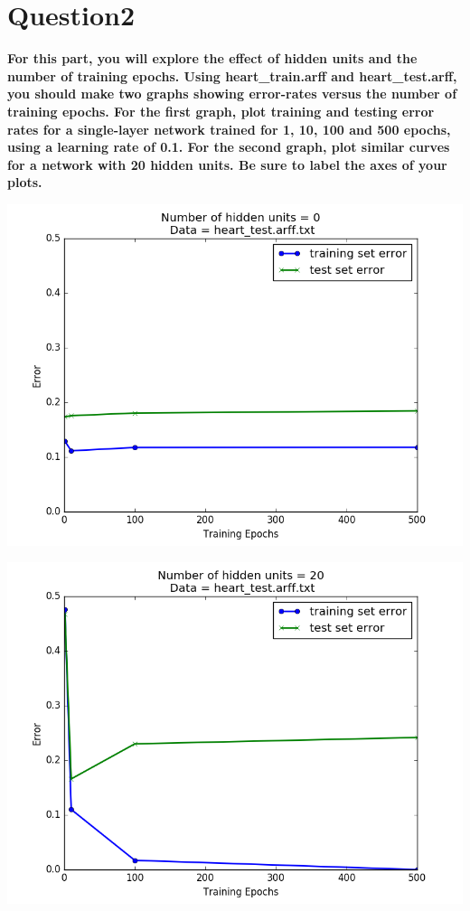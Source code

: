 \documentclass[paper=a4, fontsize=11pt]{scrartcl} %
\numberwithin{equation}{section} %
\numberwithin{figure}{section} %
\numberwithin{table}{section} %
\begin{document}
\section*{Question2}
\textbf{For this part, you will explore the effect of hidden units and the number of training epochs. Using heart\_train.arff and heart\_test.arff, you should make two graphs showing error-rates versus the number of training epochs. For the first graph, plot training and testing error rates for a single-layer network trained for 1, 10, 100 and 500 epochs, using a learning rate of 0.1. For the second graph, plot similar curves for a network with 20 hidden units. Be sure to label the axes of your plots.}
\begin{center}
\includegraphics[scale=.5]{pics/learningCurve_noHidden.png}
\end{center}
\begin{center}
\includegraphics[scale=.5]{pics/learningCurve_hidden.png}
\end{center}
\end{document}

